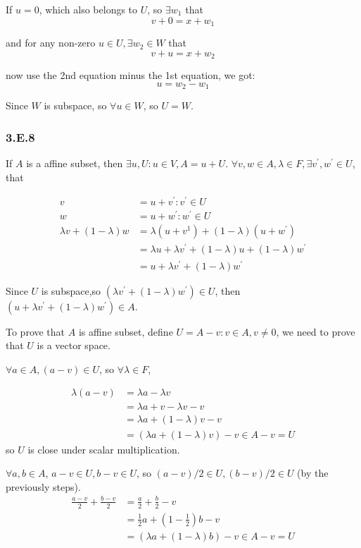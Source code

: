 If $u = 0$, which also belongs to $U$, so $\exists w_{1}$ that 
\[v + 0 = x + w_{1}\]

and for any non-zero $u \in U, \exists w_{2} \in W$ that
\[v + u = x + w_{2}\] 

now use the 2nd equation minus the 1st equation, we got:
\[u = w_{2} - w_{1}\]

Since $W$ is subspace, so $\forall u \in W$, so $U = W$.

\subsubsection*{3.E.8}

If $A$ is a affine subset, then $\exists u, U: u\in V, A = u + U$. $\forall v, w \in A, \lambda \in F, \exists v^{'}, w^{'} \in U$, that

\begin{equation*}
    \begin{split}
    v &= u + v^{'} : v^{'} \in U \\
    w &= u + w^{'} : w^{'} \in U \\
    \lambda v + (1-\lambda)w &= \lambda(u + v^{1}) + (1-\lambda)(u+w^{'}) \\
    &= \lambda u + \lambda v^{'} + (1-\lambda)u + (1-\lambda)w^{'} \\
    &= u + \lambda v^{'} + (1-\lambda)w^{'}
\end{split}
\end{equation*}

Since $U$ is subspace,so $(\lambda v^{'} + (1-\lambda)w^{'}) \in U$, then $(u+\lambda v^{'} + (1-\lambda)w^{'}) \in A$.

To prove that $A$ is affine subset, define $U = {A - v: v\in A, v\neq 0}$, we need to prove that $U$ is a vector space.

$\forall a\in A, (a-v)\in U$, so $\forall \lambda \in F$,

\begin{equation*}
    \begin{split}
    \lambda (a-v) &= \lambda a - \lambda v \\
    &= \lambda a + v - \lambda v -v \\
    & = \lambda a + (1-\lambda)v -v \\
    &= (\lambda a + (1-\lambda)v) - v \in {A-v} = U
\end{split}
\end{equation*}
so $U$ is close under scalar multiplication.

$\forall a, b \in A$, $a-v \in U, b-v\in U$, so $(a-v)/2 \in U, (b-v)/2 \in U$ (by the previously steps).
\begin{equation*}
    \begin{split}
    \frac{a-v}{2} + \frac{b-v}{2} &= \frac{a}{2} + \frac{b}{2} - v \\
    &= \frac{1}{2}a + (1-\frac{1}{2})b -v \\
    &= (\lambda a + (1-\lambda)b) -v \in {A-v} = U
    \end{split}
\end{equation*}

